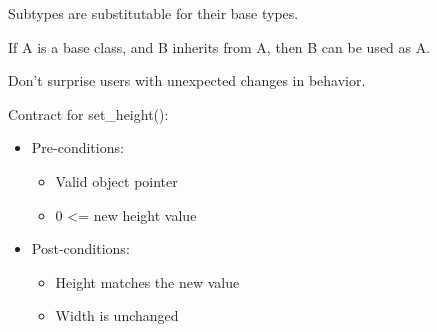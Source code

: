 \documentclass[xcolor=svgnames]{beamer}
\begin{document}

\begin{frame}{\subsecname}
Subtypes are substitutable for their base types. \pause

If A is a base class, and B inherits from A, then B can be used as A.\pause

Don't surprise users with unexpected changes in behavior.
\end{frame}


\begin{frame}{\subsecname}

    \begin{minipage}{\columnwidth}
    \end{minipage}

\end{frame}


\begin{frame}{\subsecname}

    \begin{minipage}{\columnwidth}
    \end{minipage}

\end{frame}


\begin{frame}{\subsecname}

    \begin{minipage}{\columnwidth}
    \end{minipage}

\end{frame}


\begin{frame}{\subsecname}
    Contract for set\_height():
    \begin{itemize}
        \pause \item Pre-conditions:
        \begin{itemize}
            \pause \item Valid object pointer
            \pause \item 0 <= new height value
        \end{itemize}
        \pause \item Post-conditions:
        \begin{itemize}
            \pause \item Height matches the new value
            \pause \item Width is unchanged
        \end{itemize}
    \end{itemize}
\end{frame}
\end{document}
